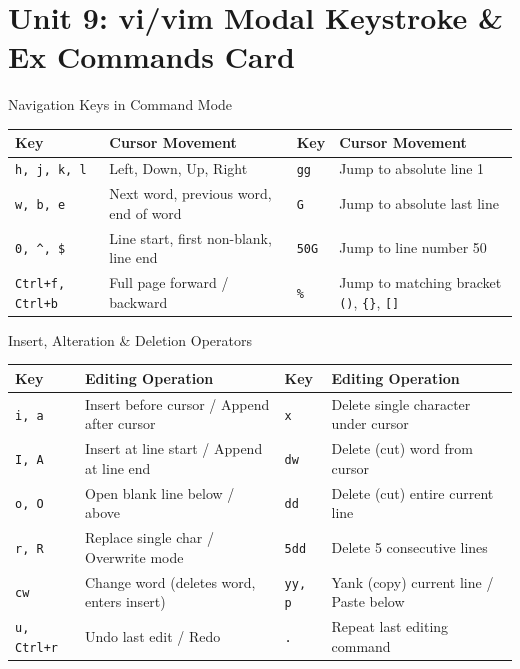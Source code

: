 \chapter{Unit 9: vi/vim Modal Keystroke \& Ex Commands Card}

\begin{cheatbox}{Navigation Keys in Command Mode}
\begin{tabularx}{\linewidth}{l X l X}
\toprule
\textbf{Key} & \textbf{Cursor Movement} & \textbf{Key} & \textbf{Cursor Movement} \\
\midrule
\texttt{h, j, k, l} & Left, Down, Up, Right & \texttt{gg} & Jump to absolute line 1 \\
\texttt{w, b, e} & Next word, previous word, end of word & \texttt{G} & Jump to absolute last line \\
\texttt{0, \^{}, \$} & Line start, first non-blank, line end & \texttt{50G} & Jump to line number 50 \\
\texttt{Ctrl+f, Ctrl+b} & Full page forward / backward & \texttt{\%} & Jump to matching bracket \texttt{()}, \texttt{\{\}}, \texttt{[]} \\
\bottomrule
\end{tabularx}
\end{cheatbox}

\begin{syntaxbox}{Insert, Alteration \& Deletion Operators}
\begin{tabularx}{\linewidth}{l X l X}
\toprule
\textbf{Key} & \textbf{Editing Operation} & \textbf{Key} & \textbf{Editing Operation} \\
\midrule
\texttt{i, a} & Insert before cursor / Append after cursor & \texttt{x} & Delete single character under cursor \\
\texttt{I, A} & Insert at line start / Append at line end & \texttt{dw} & Delete (cut) word from cursor \\
\texttt{o, O} & Open blank line below / above & \texttt{dd} & Delete (cut) entire current line \\
\texttt{r, R} & Replace single char / Overwrite mode & \texttt{5dd} & Delete 5 consecutive lines \\
\texttt{cw} & Change word (deletes word, enters insert) & \texttt{yy, p} & Yank (copy) current line / Paste below \\
\texttt{u, Ctrl+r} & Undo last edit / Redo & \texttt{.} & Repeat last editing command \\
\bottomrule
\end{tabularx}
\end{syntaxbox}

